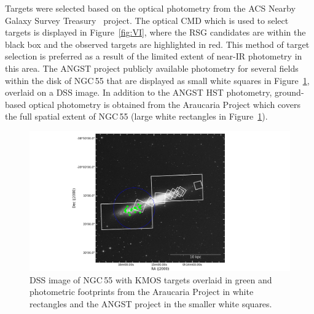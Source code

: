 

Targets were selected based on the optical photometry from the ACS Nearby Galaxy Survey Treasury~\citep[blue; ANGST][]{2009ApJS..183...67D} project.
The optical CMD which is used to select targets is displayed in Figure~\ref{fig:VI}, where the RSG candidates are within the black box and the observed targets are highlighted in red.
This method of target selection is preferred as a result of the limited extent of near-IR photometry in this area.
The ANGST project publicly available photometry for several fields within the disk of NGC\,55 that are displayed as small white squares in Figure~\ref{fig:ngc55-foot}, overlaid on a DSS image.
In addition to the ANGST HST photometry, ground-based optical photometry is obtained from the Araucaria Project which covers the full spatial extent of NGC\,55 (large white rectangles in Figure~\ref{fig:ngc55-foot}).

\begin{figure}
 \centering
 \includegraphics[width=\textwidth]{ngc55/ngc55_fields-v3}
 \caption[DSS image of NGC\,55 with KMOS and photometric footprints highlighted]{
          DSS image of NGC\,55 with KMOS targets overlaid in green and photometric footprints from the Araucaria Project
          \protect\citep{2005Msngr.121...23G} in white rectangles
          and the ANGST project
          \protect\citep{2009ApJS..183...67D} in the smaller white squares.
         }
 \label{fig:ngc55-foot}
\end{figure}

